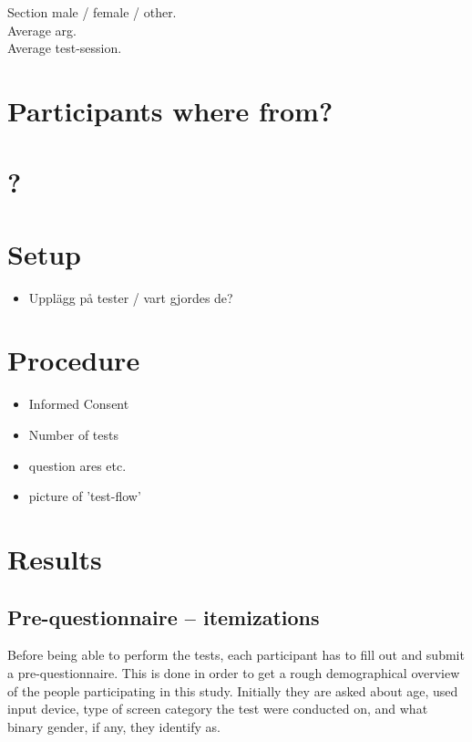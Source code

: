 \documentclass[nofilelist,dvipsnames]{cslthse-msc}
\begin{document}
      Section male / female / other. \\

      Average arg. \\

      Average test-session. \\


      \section{Participants where from?}

      \section{?}

    \section{Setup}

      \begin{itemize}
        \item{Upplägg på tester / vart gjordes de?}
      \end{itemize}

    \section{Procedure}

      \begin{itemize}
        \item{Informed Consent}
        \item{Number of tests}
        \item{question ares etc.}
        \item{picture of 'test-flow'}
      \end{itemize}

		\section{Results}

			\subsection{Pre-questionnaire -- itemizations}

        Before being able to perform the tests, each participant has to fill
        out and submit a pre-questionnaire. This is done in order to get
        a rough demographical overview of the people participating in this
        study. Initially they are asked about age, used input device, type of
        screen category the test were conducted on, and what binary gender, if
        any, they identify as.
\end{document}
